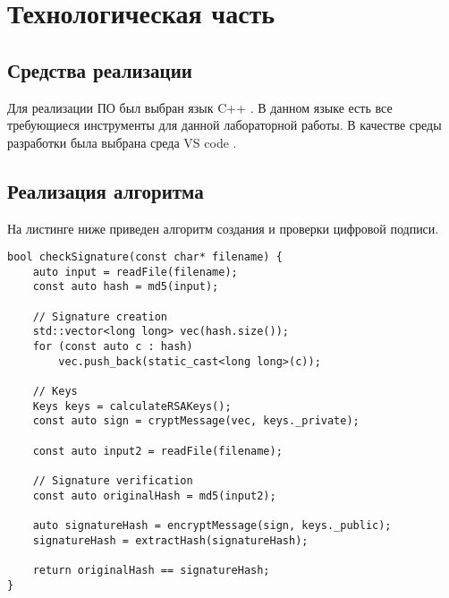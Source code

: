 \chapter{Технологическая часть}

\section{Средства реализации}

Для реализации ПО был выбран язык C++ \cite{C++}.
В данном языке есть все требующиеся инструменты для данной лабораторной работы.
В качестве среды разработки была выбрана среда VS code \cite{vscode}.

\section{Реализация алгоритма}

На листинге ниже приведен алгоритм создания и проверки цифровой подписи.

\begin{lstlisting}[caption={Алгоритм создания и проверки цифровой подписи}]
bool checkSignature(const char* filename) {
    auto input = readFile(filename);
    const auto hash = md5(input);

    // Signature creation
    std::vector<long long> vec(hash.size());
    for (const auto c : hash)
        vec.push_back(static_cast<long long>(c));

    // Keys
    Keys keys = calculateRSAKeys();
    const auto sign = cryptMessage(vec, keys._private);
    
    const auto input2 = readFile(filename);

    // Signature verification
    const auto originalHash = md5(input2);

    auto signatureHash = encryptMessage(sign, keys._public);
    signatureHash = extractHash(signatureHash);

    return originalHash == signatureHash;
}
\end{lstlisting}
